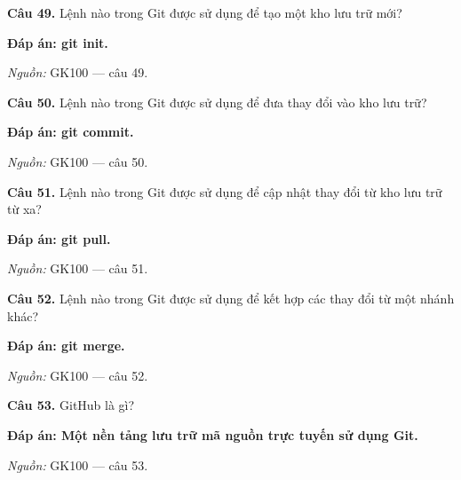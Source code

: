 \documentclass[11pt,a4paper]{article}
\begin{document}
\textbf{Câu 49.} Lệnh nào trong Git được sử dụng để tạo một kho lưu trữ mới?\par
{\color{answer}\textbf{Đáp án: git init.}}\par
{\footnotesize\color{sourcegray}\textit{Nguồn:} GK100 — câu 49.\par}
\vspace{3pt}\par\noindent{\color{black!18}\rule{\linewidth}{0.3pt}}\par\medskip

\textbf{Câu 50.} Lệnh nào trong Git được sử dụng để đưa thay đổi vào kho lưu trữ?\par
{\color{answer}\textbf{Đáp án: git commit.}}\par
{\footnotesize\color{sourcegray}\textit{Nguồn:} GK100 — câu 50.\par}
\vspace{3pt}\par\noindent{\color{black!18}\rule{\linewidth}{0.3pt}}\par\medskip

\textbf{Câu 51.} Lệnh nào trong Git được sử dụng để cập nhật thay đổi từ kho lưu trữ từ xa?\par
{\color{answer}\textbf{Đáp án: git pull.}}\par
{\footnotesize\color{sourcegray}\textit{Nguồn:} GK100 — câu 51.\par}
\vspace{3pt}\par\noindent{\color{black!18}\rule{\linewidth}{0.3pt}}\par\medskip

\textbf{Câu 52.} Lệnh nào trong Git được sử dụng để kết hợp các thay đổi từ một nhánh khác?\par
{\color{answer}\textbf{Đáp án: git merge.}}\par
{\footnotesize\color{sourcegray}\textit{Nguồn:} GK100 — câu 52.\par}
\vspace{3pt}\par\noindent{\color{black!18}\rule{\linewidth}{0.3pt}}\par\medskip

\textbf{Câu 53.} GitHub là gì?\par
{\color{answer}\textbf{Đáp án: Một nền tảng lưu trữ mã nguồn trực tuyến sử dụng Git.}}\par
{\footnotesize\color{sourcegray}\textit{Nguồn:} GK100 — câu 53.\par}
\vspace{3pt}\par\noindent{\color{black!18}\rule{\linewidth}{0.3pt}}\par\medskip
\end{document}

